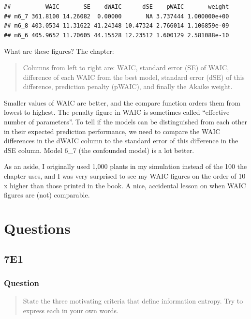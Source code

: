\documentclass[
]{book}
\begin{document}
\begin{verbatim}
##          WAIC       SE    dWAIC      dSE    pWAIC       weight
## m6_7 361.8100 14.26082  0.00000       NA 3.737444 1.000000e+00
## m6_8 403.0534 11.31622 41.24348 10.47324 2.766014 1.106859e-09
## m6_6 405.9652 11.70605 44.15528 12.23512 1.600129 2.581088e-10
\end{verbatim}

What are these figures? The chapter:

\begin{quote}
Columns from left to right are: WAIC, standard error (SE) of WAIC, difference of each WAIC from the best model, standard error (dSE) of this difference, prediction penalty (pWAIC), and finally the Akaike weight.
\end{quote}

Smaller values of WAIC are better, and the compare function orders them from lowest to highest. The penalty figure in WAIC is sometimes called ``effective number of parameters''. To tell if the models can be distinguished from each other in their expected prediction performance, we need to compare the WAIC differences in the dWAIC column to the standard error of this difference in the dSE column. Model 6\_7 (the confounded model) is a lot better.

As an aside, I originally used 1,000 plants in my simulation instead of the 100 the chapter uses, and I was very surprised to see my WAIC figures on the order of 10 x higher than those printed in the book. A nice, accidental lesson on when WAIC figures are (not) comparable.

\hypertarget{questions-6}{%
\section{Questions}\label{questions-6}}

\hypertarget{e1-5}{%
\subsection*{7E1}\label{e1-5}}

\hypertarget{question-60}{%
\subsubsection*{Question}\label{question-60}}

\begin{quote}
State the three motivating criteria that define information entropy. Try to express each in your own words.
\end{quote}
\end{document}
